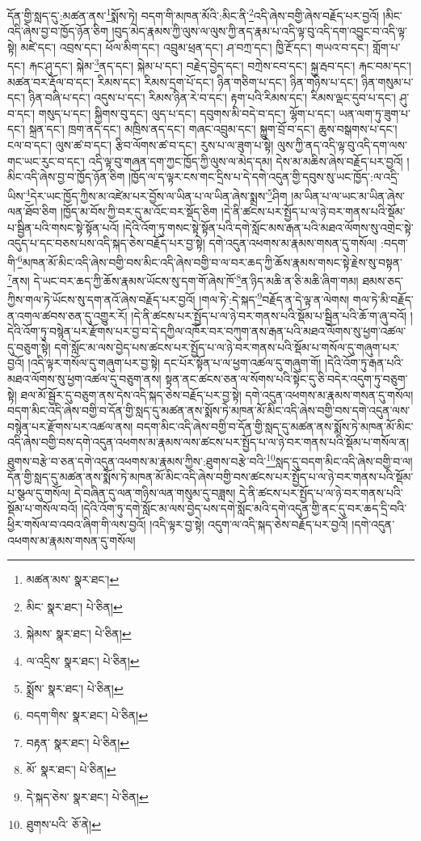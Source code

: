 དོན་གྱི་སླད་དུ་:མཚན་ནས་\footnote{མཚན་མས་  སྣར་ཐང་། }སྨོས་ཏེ། བདག་གི་མཁན་མོའི་:མིང་ནི་\footnote{མིང་  སྣར་ཐང་།  པེ་ཅིན། }འདི་ཞེས་བགྱི་ཞེས་བརྗོད་པར་བྱའོ། །མིང་འདི་ཞེས་བྱ་བ་ཁྱོད་ཉོན་ཅིག །བུད་མེད་རྣམས་ཀྱི་ལུས་ལ་ལུས་ཀྱི་ནད་རྣམ་པ་འདི་ལྟ་བུ་འདི་དག་འབྱུང་བ་འདི་ལྟ་སྟེ། མཛེ་དང་། འབྲས་དང་། ཕོལ་མིག་དང་། འབྲུམ་ཕྲན་དང་། ཤ་བཀྲ་དང་། ཁྱི་རྔོ་དང་། གཡའ་བ་དང་། གློག་པ་དང་། རྐང་ཤུ་དང་། སྐེམ་\footnote{སྐེམས་  སྣར་ཐང་།  པེ་ཅིན། }ནད་དང་། སྐེམ་པ་དང་། བརྗེད་བྱེད་དང་། བཀྲེས་ངབ་དང་། སྐྱ་རྦབ་དང་། རྐང་བམ་དང་། མཚན་བར་རྡོལ་བ་དང་། རིམས་དང་། རིམས་དྲག་པོ་དང་། ཉིན་གཅིག་པ་དང་། ཉིན་གཉིས་པ་དང་། ཉིན་གསུམ་པ་དང་། ཉིན་བཞི་པ་དང་། འདུས་པ་དང་། རིམས་ཉིན་རེ་བ་དང་། རྟག་པའི་རིམས་དང་། རིམས་ལྡང་དུབ་པ་དང་། ཤུ་བ་དང་། གསུད་པ་དང་། སྐྱིགས་བུ་དང་། ལུད་པ་དང་། དབུགས་མི་བདེ་བ་དང་། ལྷོག་པ་དང་། ཡན་ལག་ཏུ་ཟུག་པ་དང་། སྐྲན་དང་། ཁྲག་ནད་དང་། མཁྲིས་ནད་དང་། གཞང་འབྲུམ་དང་། སྐྱུག་བྲོ་བ་དང་། ཆུས་བསྒགས་པ་དང་། ངལ་བ་དང་། ལུས་ཚ་བ་དང་། རྩིབ་ལོགས་ཚ་བ་དང་། རུས་པ་ལ་ཟུག་པ་སྟེ། ལུས་ཀྱི་ནད་འདི་ལྟ་བུ་འདི་དག་ལས་གང་ཡང་རུང་བ་དང་། འདི་ལྟ་བུ་གཞན་དག་ཀྱང་ཁྱོད་ཀྱི་ལུས་ལ་མེད་དམ། དེས་མ་མཆིས་ཞེས་བརྗོད་པར་བྱའོ། །མིང་འདི་ཞེས་བྱ་བ་ཁྱོད་ཉོན་ཅིག །ཁྱོད་ལ་ད་ལྟར་ངས་གང་དྲིས་པ་དེ་དགེ་འདུན་གྱི་དབུས་སུ་ཡང་ཁྱོད་:ལ་འདྲི་ཡིས་\footnote{ལ་འདྲིས་  སྣར་ཐང་།  པེ་ཅིན། }དེར་ཡང་ཁྱོད་ཀྱིས་མ་འཛེམ་པར་བྱོས་ལ་ཡིན་པ་ལ་ཡིན་ཞེས་སྨྲས་\footnote{སྨྲོས་  སྣར་ཐང་།  པེ་ཅིན། }ཤིག །མ་ཡིན་པ་ལ་ཡང་མ་ཡིན་ཞེས་ལན་ཐོབ་ཅིག །ཁྱོད་མ་བོས་ཀྱི་བར་དུ་མ་འོང་བར་སྡོད་ཅིག །དེ་ནི་ཚངས་པར་སྤྱོད་པ་ལ་ཉེ་བར་གནས་པའི་སྡོམ་པ་སྦྱིན་པའི་གསང་སྟེ་སྟོན་པའོ། །དེའི་འོག་ཏུ་གསང་སྟེ་སྟོན་པའི་དགེ་སློང་མས་རྒན་པའི་མཐའ་ལོགས་སུ་འགྲེང་སྟེ་འདུད་པ་དང་བཅས་པས་འདི་སྐད་ཅེས་བརྗོད་པར་བྱ་སྟེ། དགེ་འདུན་འཕགས་མ་རྣམས་གསན་དུ་གསོལ། :བདག་གི་\footnote{བདག་གིས་  སྣར་ཐང་།  པེ་ཅིན། }མཁན་མོ་མིང་འདི་ཞེས་བགྱི་བས་མིང་འདི་ཞེས་བགྱི་བ་ལ་བར་ཆད་ཀྱི་ཆོས་རྣམས་གསང་སྟེ་རྗེས་སུ་བསྟན་\footnote{བརྟན་  སྣར་ཐང་།  པེ་ཅིན། }ནས། དེ་ཡང་བར་ཆད་ཀྱི་ཆོས་རྣམས་ཡོངས་སུ་དག་གོ་ཞེས་ཁོ་\footnote{མོ་  སྣར་ཐང་།  པེ་ཅིན། }ན་ཉིད་མཆི་ན་ཅི་མཆི་ཞིག་གམ། ཐམས་ཅད་ཀྱིས་གལ་ཏེ་ཡོངས་སུ་དག་ནའོ་ཞེས་བརྗོད་པར་བྱའོ། །གལ་ཏེ་:དེ་སྐད་\footnote{དེ་སྐད་ཅེས་  སྣར་ཐང་།  པེ་ཅིན། }བརྗོད་ན་དེ་ལྟ་ན་ལེགས། གལ་ཏེ་མི་བརྗོད་ན་འགལ་ཚབས་ཅན་དུ་འགྱུར་རོ། །དེ་ནི་ཚངས་པར་སྤྱོད་པ་ལ་ཉེ་བར་གནས་པའི་སྡོམ་པ་སྦྱིན་པའི་ཆོ་ག་ཞུ་བའོ། །དེའི་འོག་ཏུ་བསྙེན་པར་རྫོགས་པར་བྱ་བ་དེ་དཀྱིལ་འཁོར་བར་བཀུག་ནས་རྒན་པའི་མཐའ་ལོགས་སུ་ཕྱག་འཚལ་དུ་བཅུག་སྟེ། དགེ་སློང་མ་ལས་བྱེད་པས་ཚངས་པར་སྤྱོད་པ་ལ་ཉེ་བར་གནས་པའི་སྡོམ་པ་གསོལ་དུ་གཞུག་པར་བྱའོ། །འདི་ལྟར་གསོལ་དུ་གཞུག་པར་བྱ་སྟེ། དང་པོར་སྟོན་པ་ལ་ཕྱག་འཚལ་དུ་གཞུག་གོ། །དེའི་འོག་ཏུ་རྒན་པའི་མཐའ་ལོགས་སུ་ཕྱག་འཚལ་དུ་བཅུག་ནས། སྟན་ནང་ཚངས་ཅན་ལ་སོགས་པའི་སྟེང་དུ་ཅི་བདེར་འདུག་ཏུ་བཅུག་སྟེ། ཐལ་མོ་སྦྱོར་དུ་བཅུག་ནས་དེས་འདི་སྐད་ཅེས་བརྗོད་པར་བྱ་སྟེ། དགེ་འདུན་འཕགས་མ་རྣམས་གསན་དུ་གསོལ། བདག་མིང་འདི་ཞེས་བགྱི་བ་དོན་གྱི་སླད་དུ་མཚན་ནས་སྨོས་ཏེ་མཁན་མོ་མིང་འདི་ཞེས་བགྱི་བས་དགེ་འདུན་ལས་བསྙེན་པར་རྫོགས་པར་འཚལ་ནས། བདག་མིང་འདི་ཞེས་བགྱི་བ་དོན་གྱི་སླད་དུ་མཚན་ནས་སྨོས་ཏེ་མཁན་མོ་མིང་འདི་ཞེས་བགྱི་བས་དགེ་འདུན་འཕགས་མ་རྣམས་ལས་ཚངས་པར་སྤྱོད་པ་ལ་ཉེ་བར་གནས་པའི་སྡོམ་པ་གསོལ་ན། ཐུགས་བརྩེ་བ་ཅན་དགེ་འདུན་འཕགས་མ་རྣམས་ཀྱིས་:ཐུགས་བརྩེ་བའི་\footnote{ཐུགས་པའི་  ཅོ་ནེ། }སླད་དུ་བདག་མིང་འདི་ཞེས་བགྱི་བ་ལ། དོན་གྱི་སླད་དུ་མཚན་ནས་སྨོས་ཏེ་མཁན་མོ་མིང་འདི་ཞེས་བགྱི་བས་ཚངས་པར་སྤྱོད་པ་ལ་ཉེ་བར་གནས་པའི་སྡོམ་པ་སྩལ་དུ་གསོལ། དེ་བཞིན་དུ་ལན་གཉིས་ལན་གསུམ་དུ་བཟླས། དེ་ནི་ཚངས་པར་སྤྱོད་པ་ལ་ཉེ་བར་གནས་པའི་སྡོམ་པ་གསོལ་བའོ། །དེའི་འོག་ཏུ་དགེ་སློང་མ་ལས་བྱེད་པས་དགེ་སློང་མའི་དགེ་འདུན་གྱི་ནང་དུ་བར་ཆད་དྲི་བའི་ཕྱིར་གསོལ་བ་འབའ་ཞིག་གི་ལས་བྱའོ། །འདི་ལྟར་བྱ་སྟེ། འདུག་ལ་འདི་སྐད་ཅེས་བརྗོད་པར་བྱའོ། །དགེ་འདུན་འཕགས་མ་རྣམས་གསན་དུ་གསོལ། 